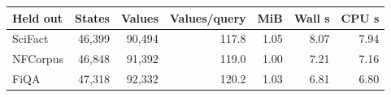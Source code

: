 \begin{tabular}{lrrrrrr}
\toprule
Held out & States & Values & Values/query & MiB & Wall s & CPU s \\
\midrule
SciFact & 46,399 & 90,494 & 117.8 & 1.05 & 8.07 & 7.94 \\
NFCorpus & 46,848 & 91,392 & 119.0 & 1.00 & 7.21 & 7.16 \\
FiQA & 47,318 & 92,332 & 120.2 & 1.03 & 6.81 & 6.80 \\
\bottomrule
\end{tabular}
